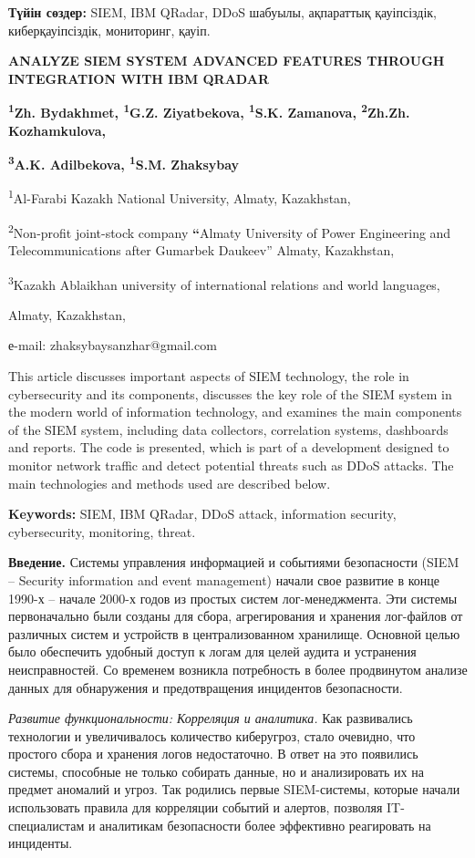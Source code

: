 \textbf{Түйін сөздер:} SIEM, IBM QRadar, DDoS шабуылы, ақпараттық
қауіпсіздік, киберқауіпсіздік, мониторинг, қауіп.

\textbf{ANALYZE SIEM SYSTEM ADVANCED FEATURES THROUGH INTEGRATION WITH
IBM QRADAR}

\textbf{\textsuperscript{1}Zh. Bydakhmet, \textsuperscript{1}G.Z.
Ziyatbekova, \textsuperscript{1}S.K. Zamanova, \textsuperscript{2}Zh.Zh.
Kozhamkulova,}

\textbf{\textsuperscript{3}A.K. Adilbekova, \textsuperscript{1}S.M.
Zhaksybay}

\textsuperscript{1}Al-Farabi Kazakh National University, Almaty,
Kazakhstan,

\textsuperscript{2}Non-profit joint-stock company \textbf{``}Almaty
University of Power Engineering and Telecommunications after Gumarbek
Daukeev'' Almaty, Kazakhstan,

\textsuperscript{3}Kazakh Ablaikhan university of international
relations and world languages,

Almaty, Kazakhstan,

е-mail: zhaksybaysanzhar@gmail.com

This article discusses important aspects of SIEM technology, the role in
cybersecurity and its components, discusses the key role of the SIEM
system in the modern world of information technology, and examines the
main components of the SIEM system, including data collectors,
correlation systems, dashboards and reports. The code is presented,
which is part of a development designed to monitor network traffic and
detect potential threats such as DDoS attacks. The main technologies and
methods used are described below.

\textbf{Keywords:} SIEM, IBM QRadar, DDoS attack, information security,
cybersecurity, monitoring, threat.

\textbf{Введение.} Системы управления информацией и событиями
безопасности (SIEM -- Security information and event management) начали
свое развитие в конце 1990-х -- начале 2000-х годов из простых систем
лог-менеджмента. Эти системы первоначально были созданы для сбора,
агрегирования и хранения лог-файлов от различных систем и устройств в
централизованном хранилище. Основной целью было обеспечить удобный
доступ к логам для целей аудита и устранения неисправностей. Со временем
возникла потребность в более продвинутом анализе данных для обнаружения
и предотвращения инцидентов безопасности.

\emph{Развитие функциональности: Корреляция и аналитика.} Как
развивались технологии и увеличивалось количество киберугроз, стало
очевидно, что простого сбора и хранения логов недостаточно. В ответ на
это появились системы, способные не только собирать данные, но и
анализировать их на предмет аномалий и угроз. Так родились первые
SIEM-системы, которые начали использовать правила для корреляции событий
и алертов, позволяя IT-специалистам и аналитикам безопасности более
эффективно реагировать на инциденты.

